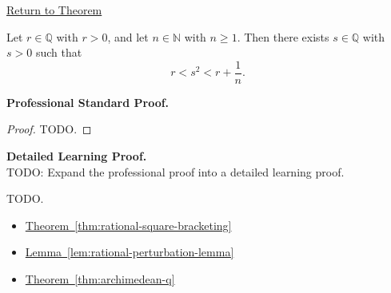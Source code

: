 \newpage
{}
\label{prf:rational-square-approximation-from-above}

\begin{remark*}[Return]
\hyperref[thm:rational-square-approximation-from-above]{Return to Theorem}
\end{remark*}

\begin{theorem*}
Let $r\in\mathbb{Q}$ with $r>0$, and let $n\in\mathbb{N}$ with $n\ge 1$.
Then there exists $s\in\mathbb{Q}$ with $s>0$ such that
\[
r<s^2<r+\frac1n.
\]
\end{theorem*}

\textbf{Professional Standard Proof.}~\\
\begin{proof}
TODO.
\end{proof}

\textbf{Detailed Learning Proof.}~\\
TODO: Expand the professional proof into a detailed learning proof.


\begin{remark*}
TODO.
\end{remark*}

\begin{dependencies}
\begin{itemize}
  \item \hyperref[thm:rational-square-bracketing]{Theorem~\ref*{thm:rational-square-bracketing}}
  \item \hyperref[lem:rational-perturbation-lemma]{Lemma~\ref*{lem:rational-perturbation-lemma}}
  \item \hyperref[thm:archimedean-q]{Theorem~\ref*{thm:archimedean-q}}
\end{itemize}
\end{dependencies}
